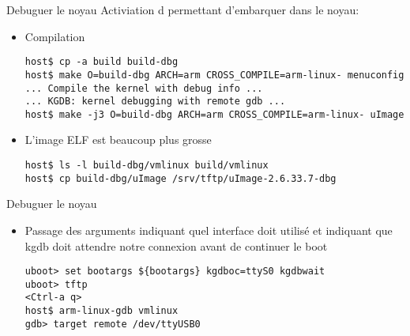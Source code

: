 \begin{frame}[fragile=singleslide]{Debuguer le noyau}
  Activiation d  permettant d'embarquer  dans
  le noyau:
  \begin{itemize}
  \item Compilation
    \begin{lstlisting}
host$ cp -a build build-dbg
host$ make O=build-dbg ARCH=arm CROSS_COMPILE=arm-linux- menuconfig
... Compile the kernel with debug info ...
... KGDB: kernel debugging with remote gdb ...
host$ make -j3 O=build-dbg ARCH=arm CROSS_COMPILE=arm-linux- uImage
    \end{lstlisting} 
  \item L'image ELF est beaucoup plus grosse
    \begin{lstlisting}
host$ ls -l build-dbg/vmlinux build/vmlinux
host$ cp build-dbg/uImage /srv/tftp/uImage-2.6.33.7-dbg
    \end{lstlisting} 
  \end{itemize}
\end{frame}

\begin{frame}[fragile=singleslide]{Debuguer le noyau}
  \begin{itemize}
  \item  Passage des arguments   indiquant  quel interface
     doit utilisé et   indiquant que kgdb doit
    attendre notre connexion avant de continuer le boot
    \begin{lstlisting}
uboot> set bootargs ${bootargs} kgdboc=ttyS0 kgdbwait
uboot> tftp
<Ctrl-a q>
host$ arm-linux-gdb vmlinux 
gdb> target remote /dev/ttyUSB0
    \end{lstlisting} 
  \end{itemize}
\end{frame}

